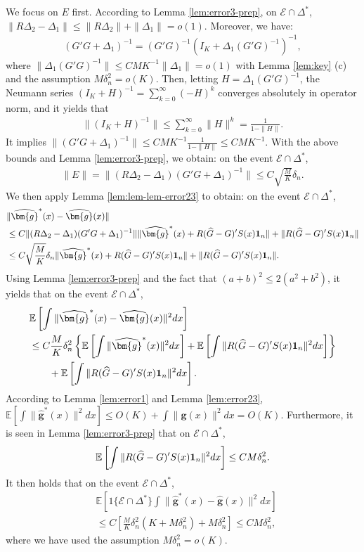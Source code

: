 \documentclass[preprint,11pt]{article}
\newcommand{\mbb}{\mathbb}
\newcommand{\mcal}{\mathcal}
\numberwithin{equation}{section}
\begin{document}
We focus on $E$ first. According to Lemma \ref{lem:error3-prep}, on $\mcal{E}\cap \Delta^*$, $\|R\Delta_2-\Delta_1\|\le \|R\Delta_2\|+\|\Delta_1\|=o(1)$. Moreover, we have:
\begin{align*}
    (G'G+\Delta_1)^{-1}=(G'G)^{-1}(I_K+\Delta_1(G'G)^{-1})^{-1},
\end{align*}
where $\|\Delta_1(G'G)^{-1}\|\le CMK^{-1}\|\Delta_1\|=o(1)$ with Lemma \ref{lem:key} (c) and the assumption $M\delta_n^2=o(K)$. Then, letting $H=\Delta_1(G'G)^{-1}$, the Neumann series $(I_K+H)^{-1}=\sum_{k=0}^\infty(-H)^k$ converges absolutely in operator norm, and it yields that
\begin{align*}
    \|(I_K+H)^{-1}\|\le \sum_{k=0}^\infty\|H\|^k=\frac{1}{1-\|H\|}.
\end{align*}
It implies $\|(G'G+\Delta_1)^{-1}\|\le CMK^{-1}\frac{1}{1-\|H\|}\le CMK^{-1}$. With the above bounds and Lemma \ref{lem:error3-prep}, we obtain: on the event $\mcal{E}\cap \Delta^*$, 
\begin{align*}
    \|E\| =\|(R\Delta_2-\Delta_1)(G'G+\Delta_1)^{-1}\|\le C\sqrt{\frac{M}{K}}\delta_n. 
\end{align*}
We then apply Lemma \ref{lem:lem-lem-error23} to obtain: on the event $\mcal{E}\cap \Delta^*$,
\begin{align*}
    &\|\widehat{\bm{g}}^*(x)-\widehat{\bm{g}}(x)\|\\&\le C \|(R\Delta_2-\Delta_1)(G'G+\Delta_1)^{-1}\|\|\widehat{\bm{g}}^*(x)+R(\widehat{G}-G)'S(x){\bf 1}_n\|+\|R(\widehat{G}-G)'S(x){\bf 1}_n\|\\
    &\le C\sqrt{\frac{M}{K}}\delta_n\|\widehat{\bm{g}}^*(x)+R(\widehat{G}-G)'S(x){\bf 1}_n\|+\|R(\widehat{G}-G)'S(x){\bf 1}_n\|.
\end{align*}
Using Lemma \ref{lem:error3-prep} and the fact that $(a+b)^2\le 2(a^2+b^2)$, it yields that on the event $\mcal{E}\cap \Delta^*$,
\begin{align*}
    &\mbb{E}\left[\int \|\widehat{\bm{g}}^*(x)-\widehat{\bm{g}}(x)\|^2dx\right]\\
    &\le C\frac{M}{K}\delta_n^2\left\{\mbb{E}\left[\int \|\widehat{\bm{g}}^*(x)\|^2dx\right]+\mbb{E}\left[\int \|R(\widehat{G}-G)'S(x){\bf 1}_n\|^2dx\right]\right\}\\
    &\qquad+\mbb{E}\left[\int \|R(\widehat{G}-G)'S(x){\bf 1}_n\|^2dx\right].
\end{align*}
According to Lemma \ref{lem:error1} and Lemma \ref{lem:error23}, $\mbb{E}\left[\int \|\widehat{\bm{g}}^*(x)\|^2dx\right]\le O(K)+\int \|\bm{g}(x)\|^2dx=O(K)$. Furthermore, it is seen in Lemma \ref{lem:error3-prep} that on $\mcal{E}\cap \Delta^*$, $$\mbb{E}\left[\int \|R(\widehat{G}-G)'S(x){\bf 1}_n\|^2dx\right]\le CM\delta_n^2.$$ It then holds that on the event $\mcal{E}\cap \Delta^*$,
\begin{align*}
    &\mbb{E}\left[1\{\mcal{E}\cap \Delta^*\}\int \|\widehat{\bm{g}}^*(x)-\widehat{\bm{g}}(x)\|^2dx\right]\\
    &\le C\left[\frac{M}{K}\delta_n^2\left(K+M\delta_n^2\right)+M\delta
    _n^2\right]\le  CM\delta_n^2,
\end{align*}
where we have used the assumption $M\delta_n^2=o(K)$.
\end{document}
